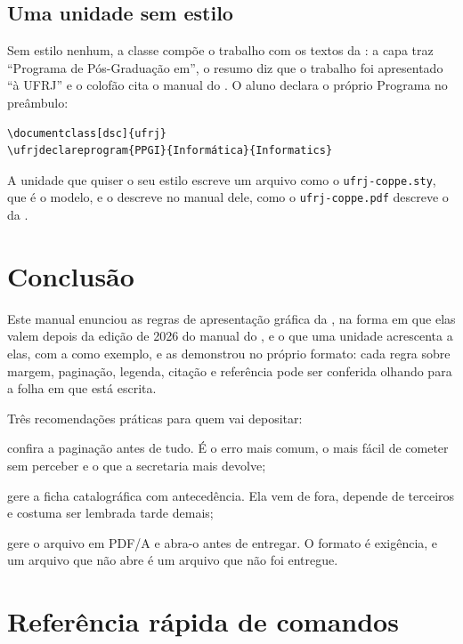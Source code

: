 \documentclass[dsc]{ufrj}
\begin{document}
  \section{Uma unidade sem estilo}

  Sem estilo nenhum, a classe compõe o trabalho com os textos da
  : a capa traz ``Programa de Pós-Graduação em'', o resumo diz que o
  trabalho foi apresentado ``à UFRJ'' e o colofão cita o manual do
  . O aluno declara o próprio Programa no preâmbulo:

\begin{verbatim}
\documentclass[dsc]{ufrj}
\ufrjdeclareprogram{PPGI}{Informática}{Informatics}
\end{verbatim}

  \noindent A unidade que quiser o seu estilo escreve um arquivo como o
  \texttt{ufrj-coppe.sty}, que é o modelo, e o descreve no manual dele, como o
  \texttt{ufrj-coppe.pdf} descreve o da .

  \chapter{Conclusão}

  Este manual enunciou as regras de apresentação gráfica da , na
  forma em que elas valem depois da edição de 2026 do manual do , e
  o que uma unidade acrescenta a elas, com a  como exemplo, e as
  demonstrou no próprio formato: cada regra sobre margem, paginação, legenda,
  citação e referência pode ser conferida olhando para a folha em que está
  escrita.

  Três recomendações práticas para quem vai depositar:

  \begin{alineas}
    \item confira a paginação antes de tudo. É o erro mais comum, o mais fácil de
      cometer sem perceber e o que a secretaria mais devolve;
    \item gere a ficha catalográfica com antecedência. Ela vem de fora, depende
      de terceiros e costuma ser lembrada tarde demais;
    \item gere o arquivo em PDF/A e abra-o antes de entregar. O formato é
      exigência, e um arquivo que não abre é um arquivo que não foi entregue.
  \end{alineas}

  \appendix

  \chapter{Referência rápida de comandos}
\end{document}
